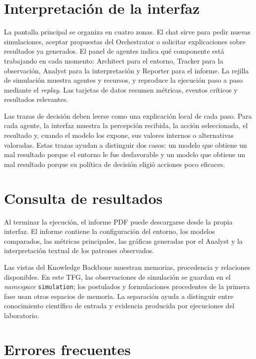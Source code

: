\section{Interpretación de la interfaz}

La pantalla principal se organiza en cuatro zonas. El chat sirve para pedir nuevas
simulaciones, aceptar propuestas del Orchestrator o solicitar explicaciones
sobre resultados ya generados. El panel de agentes indica qué componente está
trabajando en cada momento: Architect para el entorno, Tracker para la
observación, Analyst para la interpretación y Reporter para el informe. La
rejilla de simulación muestra agentes y recursos, y reproduce la
ejecución paso a paso mediante el \textit{replay}. Las tarjetas de datos
resumen métricas, eventos críticos y resultados relevantes.

Las trazas de decisión deben leerse como una explicación local de cada paso.
Para cada agente, la interfaz muestra la percepción recibida, la acción
seleccionada, el resultado y, cuando el modelo los expone, sus valores internos
o alternativas valoradas. Estas trazas ayudan a distinguir dos casos:
un modelo que obtiene un mal resultado porque el entorno le fue desfavorable y
un modelo que obtiene un mal resultado porque su política de decisión eligió
acciones poco eficaces.

\section{Consulta de resultados}

Al terminar la ejecución, el informe PDF puede descargarse desde la propia
interfaz. El informe contiene la configuración del entorno, los modelos
comparados, las métricas principales, las gráficas generadas por el Analyst y la
interpretación textual de los patrones observados.

Las vistas del Knowledge Backbone muestran memorias, procedencia y
relaciones disponibles. En este TFG, las observaciones de simulación se guardan
en el \textit{namespace} \texttt{simulation}; los postulados y formulaciones
procedentes de la primera fase usan otros espacios de memoria. La separación
ayuda a distinguir entre conocimiento científico de entrada y
evidencia producida por ejecuciones del laboratorio.

\section{Errores frecuentes}

